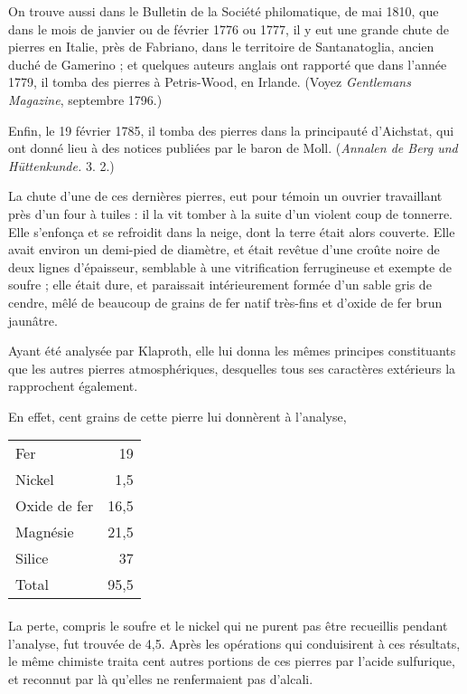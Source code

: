 \documentclass[a4paper, 12pt, oneside, french]{article}
\begin{document}
On trouve aussi dans le Bulletin de la Société philomatique, de mai 1810, que dans le mois de janvier ou de février 1776 ou 1777, il y eut une grande chute de pierres en Italie, près de Fabriano, dans le territoire de Santanatoglia, ancien duché de Gamerino ; et quelques auteurs anglais ont rapporté que dans l'année 1779, il tomba des pierres à Petris-Wood, en Irlande. (Voyez \emph{Gentlemans Magazine}, septembre 1796.)

Enfin, le 19 février 1785, il tomba des pierres dans la principauté d'Aichstat, qui ont donné lieu à des notices publiées par le baron de Moll. (\emph{Annalen de Berg und Hüttenkunde.} 3. 2.)

La chute d'une de ces dernières pierres, eut pour témoin un ouvrier travaillant près d'un four à tuiles : il la vit tomber à la suite d'un violent coup de tonnerre. Elle s'enfonça et se refroidit dans la neige, dont la terre était alors couverte. Elle avait environ un demi-pied de diamètre, et était revêtue d'une croûte noire de deux lignes d'épaisseur, semblable à une vitrification ferrugineuse et exempte de soufre ; elle était dure, et paraissait intérieurement formée d'un sable gris de cendre, mêlé de beaucoup de grains de fer natif très-fins et d'oxide de fer brun jaunâtre.

Ayant été analysée par Klaproth, elle lui donna les mêmes principes constituants que les autres pierres atmosphériques, desquelles tous ses caractères extérieurs la rapprochent également.

En effet, cent grains de cette pierre lui donnèrent à l'analyse,
\begin{table}[H]
    \centering
    \begin{tabular}{l r}
        Fer & 19 \\
        Nickel & 1,5 \\
        Oxide de fer & 16,5 \\
        Magnésie & 21,5 \\
        Silice & 37 \\ \hline
        Total & 95,5 \\
    \end{tabular}
\end{table}
\paragraph{}
La perte, compris le soufre et le nickel qui ne purent pas être recueillis pendant l'analyse, fut trouvée de 4,5. Après les opérations qui conduisirent à ces résultats, le même chimiste traita cent autres portions de ces pierres par l'acide sulfurique, et reconnut par là qu'elles ne renfermaient pas d'alcali.
\end{document}
